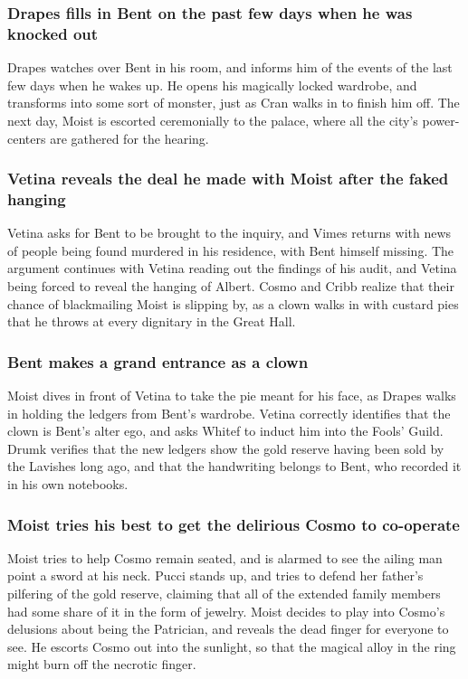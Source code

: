 \subsubsection{\Gls{Drapes} fills in \Gls{Bent} on the past few days when he was knocked out}
\Gls{Drapes} watches over \Gls{Bent} in his room, and informs him of the events of the last few
days when he wakes up. He opens his magically locked wardrobe, and transforms into some sort of
monster, just as \Gls{Cran} walks in to finish him off. The next day, \Gls{Moist} is escorted
ceremonially to the palace, where all the city's power-centers are gathered for the hearing.

\subsubsection{\Gls{Vetina} reveals the deal he made with \Gls{Moist} after the faked hanging}
\Gls{Vetina} asks for \Gls{Bent} to be brought to the inquiry, and \Gls{Vimes} returns with news
of people being found murdered in his residence, with \Gls{Bent} himself missing. The argument
continues with \Gls{Vetina} reading out the findings of his audit, and \Gls{Vetina} being forced
to reveal the hanging of \Gls{Albert}. \Gls{Cosmo} and \Gls{Cribb} realize that their chance of
blackmailing \Gls{Moist} is slipping by, as a clown walks in with custard pies that he throws at
every dignitary in the Great Hall.

\subsubsection{\Gls{Bent} makes a grand entrance as a clown}
\Gls{Moist} dives in front of \Gls{Vetina} to take the pie meant for his face, as \Gls{Drapes} walks
in holding the ledgers from \Gls{Bent}'s wardrobe. \Gls{Vetina} correctly identifies that the
clown is \Gls{Bent}'s alter ego, and asks \Gls{Whitef} to induct him into the Fools' Guild.
\Gls{Drumk} verifies that the new ledgers show the gold reserve having been sold by the Lavishes
long ago, and that the handwriting belongs to \Gls{Bent}, who recorded it in his own notebooks.

\subsubsection{\Gls{Moist} tries his best to get the delirious \Gls{Cosmo} to co-operate}
\Gls{Moist} tries to help \Gls{Cosmo} remain seated, and is alarmed to see the ailing man point a
sword at his neck. \Gls{Pucci} stands up, and tries to defend her father's pilfering of the gold
reserve, claiming that all of the extended family members had some share of it in the form of
jewelry. \Gls{Moist} decides to play into \Gls{Cosmo}'s delusions about being the Patrician, and
reveals the dead finger for everyone to see. He escorts \Gls{Cosmo} out into the sunlight, so that
the magical alloy in the ring might burn off the necrotic finger.

